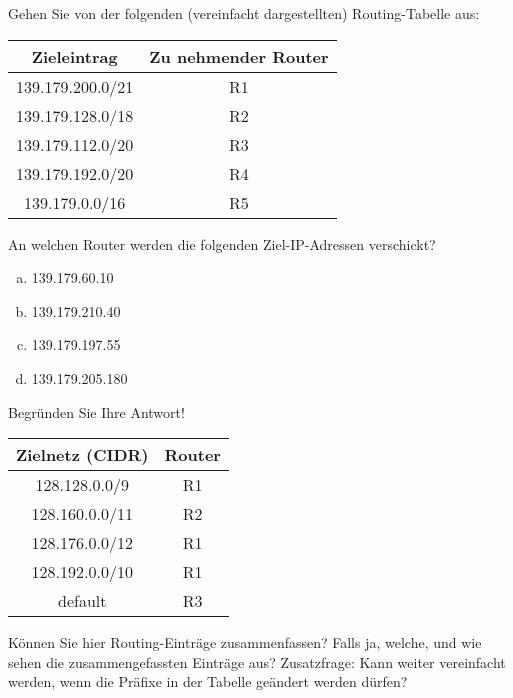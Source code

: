 
Gehen Sie von der folgenden (vereinfacht dargestellten) Routing-Tabelle aus:

\begin{center}
    \begin{tabular}{|c|c|}
        \hline
        Zieleintrag & Zu nehmender Router \tabularnewline
        \hline
        139.179.200.0/21 & R1 \tabularnewline
        139.179.128.0/18 & R2 \tabularnewline
        139.179.112.0/20 & R3 \tabularnewline
        139.179.192.0/20 & R4 \tabularnewline
        139.179.0.0/16 & R5 \tabularnewline
        \hline
    \end{tabular}
\end{center}

An welchen Router werden die folgenden Ziel-IP-Adressen verschickt?

\begin{enumerate}[(a)]
    \item 139.179.60.10
    \item 139.179.210.40
    \item 139.179.197.55
    \item 139.179.205.180
\end{enumerate}

Begründen Sie Ihre Antwort!


\begin{center}
    \begin{tabular}{|c | c|}
        \hline
        Zielnetz (CIDR) & Router \tabularnewline
        \hline
        128.128.0.0/9 & R1 \tabularnewline
        128.160.0.0/11 & R2 \tabularnewline
        128.176.0.0/12 & R1 \tabularnewline
        128.192.0.0/10 & R1 \tabularnewline
        default & R3 \tabularnewline
        \hline
    \end{tabular}
\end{center}

Können Sie hier Routing-Einträge zusammenfassen?
Falls ja, welche, und wie sehen die zusammengefassten Einträge aus?
Zusatzfrage:
Kann weiter vereinfacht werden, wenn die Präfixe in der Tabelle geändert werden dürfen?